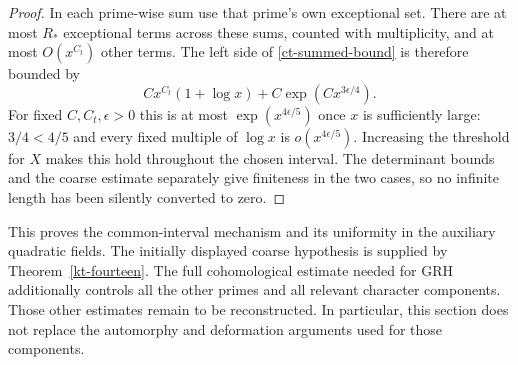 \begin{proof}
In each prime-wise sum use that prime's own exceptional set.
There are at most $R_*$ exceptional terms across these sums,
counted with multiplicity, and at most
$O(x^{C_t})$ other terms. The left side of
\eqref{ct-summed-bound} is therefore bounded by
\[
 Cx^{C_t}(1+\log x)+C\exp(Cx^{3\epsilon/4}).
\]
For fixed $C,C_t,\epsilon>0$ this is at most
$\exp(x^{4\epsilon/5})$ once $x$ is sufficiently large:
$3/4<4/5$ and every fixed multiple of $\log x$ is
$o(x^{4\epsilon/5})$. Increasing the threshold for $X$ makes
this hold throughout the chosen interval. The determinant bounds
and the coarse estimate separately give finiteness in the two
cases, so no infinite length has been silently converted to zero.
\end{proof}

This proves the common-interval mechanism and its uniformity in
the auxiliary quadratic fields. The initially displayed coarse
hypothesis is supplied by Theorem~\ref{kt-fourteen}.
The full cohomological estimate needed
for GRH additionally controls all the other primes and all relevant
character components. Those other estimates remain to be reconstructed. In
particular, this section does not replace the automorphy and
deformation arguments used for those components.


